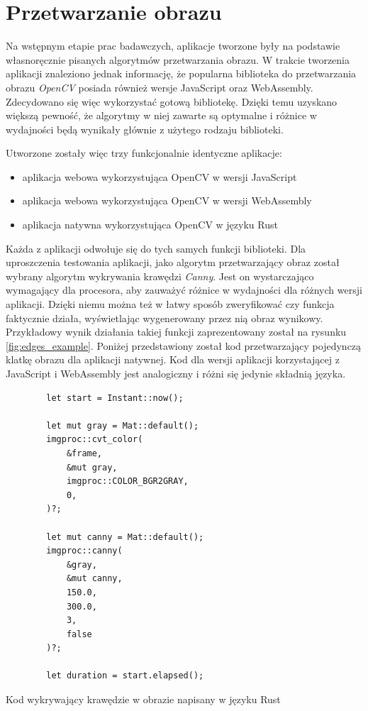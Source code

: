 \documentclass[language=polish,type=master]{aghmodern}
\begin{document}
\section{Przetwarzanie obrazu}
Na wstępnym etapie prac badawczych, aplikacje tworzone były na podstawie własnoręcznie pisanych algorytmów przetwarzania obrazu.
W trakcie tworzenia aplikacji znaleziono jednak informację, że popularna biblioteka do przetwarzania obrazu \emph{OpenCV}\footnotemark{} posiada również wersje JavaScript oraz WebAssembly.
Zdecydowano się więc wykorzystać gotową bibliotekę.
Dzięki temu uzyskano większą pewność, że algorytmy w niej zawarte są optymalne i różnice w wydajności będą wynikały głównie z użytego rodzaju biblioteki.

Utworzone zostały więc trzy funkcjonalnie identyczne aplikacje:
\begin{itemize}
    \item aplikacja webowa wykorzystująca OpenCV w wersji JavaScript
    \item aplikacja webowa wykorzystująca OpenCV w wersji WebAssembly
    \item aplikacja natywna wykorzystująca OpenCV w języku Rust
\end{itemize}

Każda z aplikacji odwołuje się do tych samych funkcji biblioteki.
Dla uproszczenia testowania aplikacji, jako algorytm przetwarzający obraz został wybrany algorytm wykrywania krawędzi \emph{Canny}\footnotemark{}.
Jest on wystarczająco wymagający dla procesora, aby zauważyć różnice w wydajności dla różnych wersji aplikacji.
Dzięki niemu można też w łatwy sposób zweryfikować czy funkcja faktycznie działa, wyświetlając wygenerowany przez nią obraz wynikowy.
Przykładowy wynik działania takiej funkcji zaprezentowany został na rysunku \ref{fig:edges_example}.
Poniżej przedstawiony został kod przetwarzający pojedynczą klatkę obrazu dla aplikacji natywnej.
Kod dla wersji aplikacji korzystającej z JavaScript i WebAssembly jest analogiczny i różni się jedynie składnią języka.

\begin{listing}[H]
    \begin{verbatim}
        let start = Instant::now();

        let mut gray = Mat::default();
        imgproc::cvt_color(
            &frame,
            &mut gray,
            imgproc::COLOR_BGR2GRAY,
            0,
        )?;

        let mut canny = Mat::default();
        imgproc::canny(
            &gray,
            &mut canny,
            150.0,
            300.0,
            3,
            false
        )?;

        let duration = start.elapsed();
    \end{verbatim}
    \caption{Kod wykrywający krawędzie w obrazie napisany w języku Rust}
\end{listing}
\end{document}
